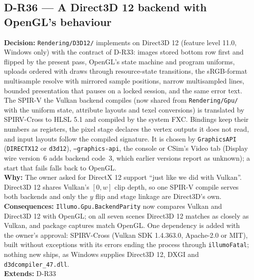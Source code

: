 \subsection*{D-R36 --- A Direct3D 12 backend with OpenGL's behaviour}
\begin{decisionbox}[title={D-R36 \quad 2026-10-01}]
\textbf{Decision:} \texttt{Rendering/D3D12/} implements 
on Direct3D 12 (feature level 11.0, Windows only) with the contract of D-R33:
images stored bottom row first and flipped by the present pass, OpenGL's
state machine and program uniforms, uploads ordered with draws through
resource-state transitions, the sRGB-format multisample resolve with mirrored
sample positions, narrow multisampled lines, bounded presentation that pauses
on a locked session, and the same error text. The SPIR-V the Vulkan backend
compiles (now shared from \texttt{Rendering/Gpu/} with the uniform state,
attribute layouts and texel conversions) is translated by SPIRV-Cross to HLSL
5.1 and compiled by the system FXC. Bindings keep their numbers as registers,
the pixel stage declares the vertex outputs it does not read, and input
layouts follow the compiled signature. It is chosen by \texttt{GraphicsAPI}
(\texttt{DIRECTX12} or \texttt{d3d12}), \texttt{--graphics-api}, the console
or CSim's Video tab (Display wire version~6 adds backend code~3, which earlier
versions report as unknown); a start that fails falls back to OpenGL.\\
\textbf{Why:} The owner asked for DirectX 12 support ``just like we did with
Vulkan''. Direct3D 12 shares Vulkan's $[0,w]$ clip depth, so one SPIR-V
compile serves both backends and only the $y$ flip and stage linkage are
Direct3D's own.\\
\textbf{Consequences:} \texttt{Illumo.Gpu.BackendParity} now compares
Vulkan and Direct3D 12 with OpenGL; on all seven scenes Direct3D 12 matches as
closely as Vulkan, and package captures match OpenGL. One dependency is added
with the owner's approval: SPIRV-Cross (Vulkan SDK 1.4.363.0, Apache-2.0 or
MIT), built without exceptions with its errors ending the process through
\texttt{illumoFatal}; nothing new ships, as Windows supplies Direct3D 12,
DXGI and \texttt{d3dcompiler\_47.dll}.\\
\textbf{Extends:} D-R33
\end{decisionbox}

